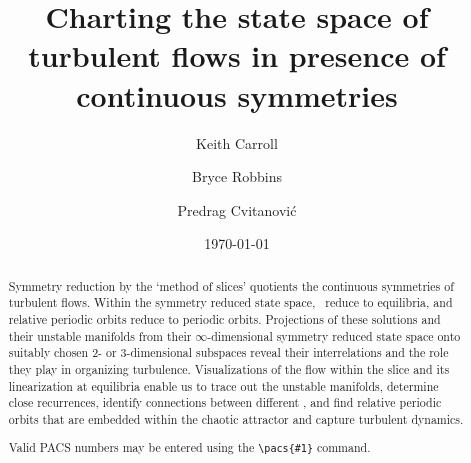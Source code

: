 \documentclass[twocolumn,
secnumarabic,
nofootinbib, tightenlines,
nobibnotes, showkeys, aps,
cha]{revtex4-1}
\begin{document}
\title[Charting the state space of turbulent flows]
{Charting the state space of turbulent flows
 in presence of continuous symmetries}

\author{Keith Carroll}
\author{Bryce Robbins}
\author{Predrag Cvitanovi{\'c}}

\date{\today}

\begin{abstract}
Symmetry reduction by the `method of slices'
quotients the continuous symmetries of turbulent flows. Within the
symmetry reduced state space, \reqva\ reduce to
equilibria, and relative periodic orbits reduce to periodic orbits.
Projections of these solutions and their unstable manifolds from their
$\infty$-dimensional symmetry reduced state space onto suitably chosen 2-
or 3-dimensional subspaces reveal their interrelations and the role they
play in organizing turbulence. Visualizations
of the flow within the slice and its linearization at equilibria enable
us to trace out the unstable manifolds, determine close recurrences,
identify connections between different \reqva, and
find relative periodic orbits that
are embedded within the chaotic attractor and capture turbulent dynamics.

%
Valid PACS numbers may be entered using the \verb+\pacs{#1}+ command.
\end{abstract}

\maketitle








% 


\end{document}

